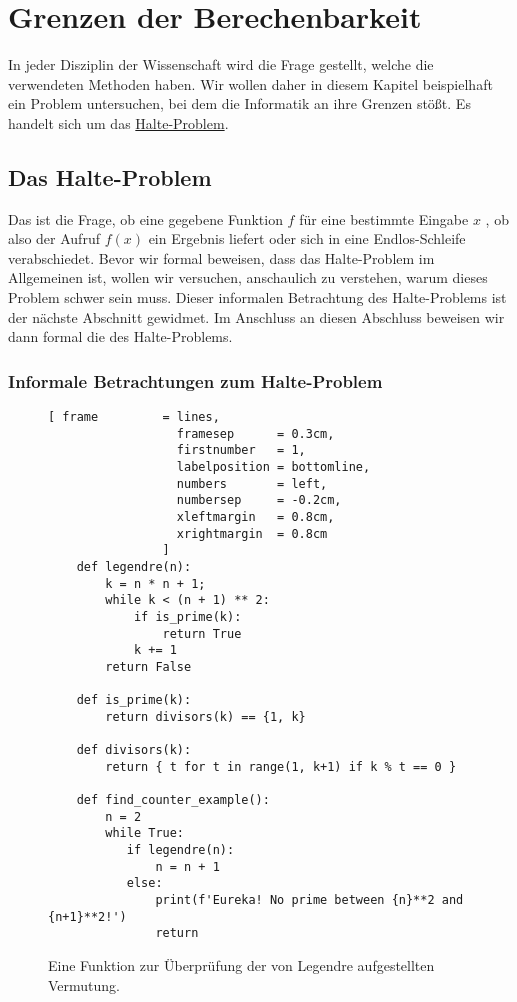 \chapter{Grenzen der Berechenbarkeit}
In jeder Disziplin der Wissenschaft wird die Frage gestellt, welche  die
verwendeten Methoden haben.   Wir wollen daher in diesem Kapitel beispielhaft ein Problem
untersuchen, bei dem die Informatik an ihre Grenzen stößt.  Es handelt sich um das
\href{http://de.wikipedia.org/wiki/Halteproblem}{Halte-Problem}.  

\section{Das Halte-Problem}
Das  ist die Frage, ob eine gegebene Funktion $f$ für eine bestimmte Eingabe $x$ 
, ob also der Aufruf $f(x)$ ein Ergebnis liefert oder sich in eine Endlos-Schleife
verabschiedet.   Bevor wir formal beweisen, dass das Halte-Problem im Allgemeinen  ist, wollen 
wir versuchen, anschaulich zu verstehen, warum dieses Problem schwer sein muss.  Dieser informalen
Betrachtung des Halte-Problems ist der nächste Abschnitt gewidmet.  Im Anschluss an diesen Abschluss
beweisen wir dann formal die  des Halte-Problems. 

\subsection{Informale Betrachtungen zum Halte-Problem}


\begin{figure}[!ht]
\centering
\begin{Verbatim}[ frame         = lines, 
                  framesep      = 0.3cm, 
                  firstnumber   = 1,
                  labelposition = bottomline,
                  numbers       = left,
                  numbersep     = -0.2cm,
                  xleftmargin   = 0.8cm,
                  xrightmargin  = 0.8cm
                ]
    def legendre(n):
        k = n * n + 1;
        while k < (n + 1) ** 2:
            if is_prime(k):
                return True
            k += 1
        return False
    
    def is_prime(k):
        return divisors(k) == {1, k}    
    
    def divisors(k):
        return { t for t in range(1, k+1) if k % t == 0 }
    
    def find_counter_example():
        n = 2
        while True:
           if legendre(n):
               n = n + 1
           else:
               print(f'Eureka! No prime between {n}**2 and {n+1}**2!')
               return
\end{Verbatim} 
\vspace*{-0.3cm}
\caption{Eine Funktion zur Überprüfung der von Legendre aufgestellten Vermutung.}
\label{fig:legendre.stlx}
\end{figure}

